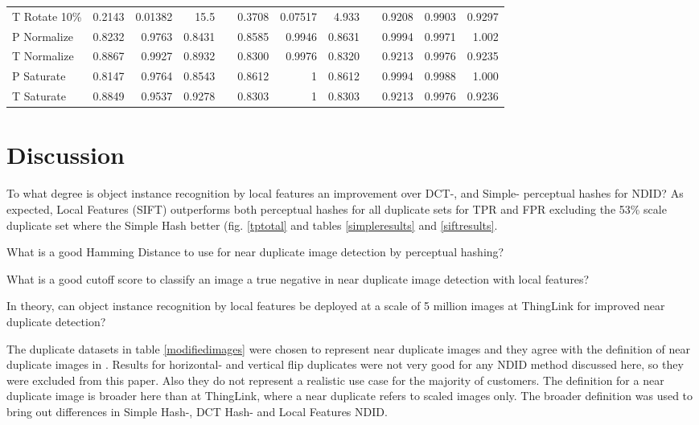 \documentclass[english,12pt,a4paper,pdftex,elec,utf8]{aaltothesis}
\begin{document}
\begin{table}
\begin{center}
\begin{tabular}{@{}lrrrrrrrrrrr@{}}
 T Rotate 10\%  & 0.2143 & 0.01382 & 15.5 &\phantom{abc} & 0.3708 & 0.07517 & 4.933 &\phantom{abc} & 0.9208 & 0.9903 & 0.9297 \\
 P Normalize    & 0.8232 & 0.9763 & 0.8431 &\phantom{abc} & 0.8585 & 0.9946 & 0.8631 &\phantom{abc} & 0.9994 & 0.9971 & 1.002\\
 T Normalize    & 0.8867 & 0.9927 & 0.8932 &\phantom{abc} & 0.8300 & 0.9976 & 0.8320 &\phantom{abc} & 0.9213 & 0.9976 & 0.9235 \\
 P Saturate     & 0.8147 & 0.9764 & 0.8543 &\phantom{abc} & 0.8612  & 1 & 0.8612 &\phantom{abc} & 0.9994 & 0.9988 & 1.000\\
 T Saturate     & 0.8849 & 0.9537 & 0.9278 &\phantom{abc} & 0.8303 & 1 & 0.8303 &\phantom{abc} & 0.9213 & 0.9976 & 0.9236 \\
    \bottomrule
\end{tabular}
\end{center}\end{table}

\clearpage

\section{Discussion}
To what degree is object instance recognition by local features an improvement over DCT-, and Simple- perceptual hashes for NDID? As expected, Local Features (SIFT) outperforms both perceptual hashes for all duplicate sets for TPR and FPR excluding the 53\% scale duplicate set where the Simple Hash better (fig. \ref{tptotal} and tables \ref{simpleresults} and \ref{siftresults}.


What is a good Hamming Distance to use for near duplicate image detection by perceptual hashing?

What is a good cutoff score to classify an image a true negative in near duplicate image detection with local features?

In theory, can object instance recognition by local features be deployed at a scale of 5 million images at ThingLink for improved near duplicate detection?





The duplicate datasets in table \ref{modifiedimages} were chosen to represent near duplicate images and they agree with the definition of near duplicate images in \cite{Wang2013}. Results for horizontal- and vertical flip duplicates were not very good for any NDID method discussed here, so they were excluded from this paper. Also they do not represent a realistic use case for the majority of customers. The definition for a near duplicate image is broader here than at ThingLink, where a near duplicate refers to scaled images only. The broader definition was used to bring out differences in Simple Hash-, DCT Hash- and Local Features NDID.
\end{document}
